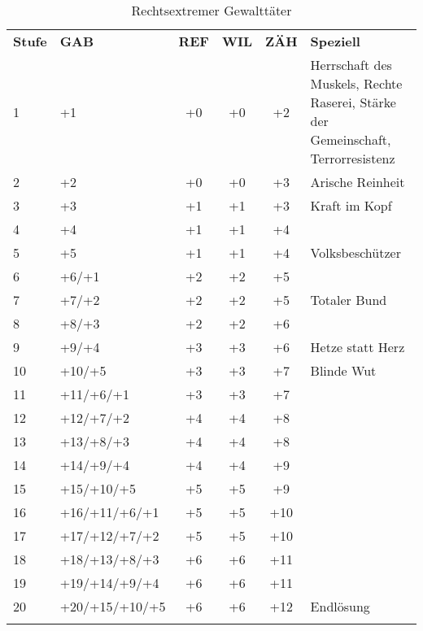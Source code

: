 \documentclass[
	ngerman,
	a4paper,
	11pt,
	twocolumn,
]{scrartcl}
\newlength{\thicktableline}
\newlength{\thintableline}
\newlength{\aboveline}
\newlength{\belowline}
\begin{document}
\begin{table*}[htbp]
	\centering
	\caption{Rechtsextremer Gewalttäter}
	\footnotesize
	\begin{tabularx}{\textwidth}{llcccX}
		\textbf{Stufe}	&\textbf{GAB}	&\textbf{REF}	&\textbf{WIL}	&\textbf{ZÄH}	&\textbf{Speziell}	\\	\specialrule{\thicktableline}{\aboveline}{\belowline}
		1		&+1				&+0		&+0		&+2		&Herrschaft des Muskels, Rechte Raserei, Stärke der Gemeinschaft, Terrorresistenz	\\	\specialrule{\thintableline}{\aboveline}{\belowline}
		2		&+2				&+0		&+0		&+3		&Arische Reinheit	\\	\specialrule{\thintableline}{\aboveline}{\belowline}
		3		&+3				&+1		&+1		&+3		&Kraft im Kopf	\\	\specialrule{\thintableline}{\aboveline}{\belowline}
		4		&+4				&+1		&+1		&+4		&	\\	\specialrule{\thintableline}{\aboveline}{\belowline}
		5		&+5				&+1		&+1		&+4		&Volksbeschützer	\\	\specialrule{\thintableline}{\aboveline}{\belowline}
		6		&+6/+1			&+2		&+2		&+5		&	\\	\specialrule{\thintableline}{\aboveline}{\belowline}
		7		&+7/+2			&+2		&+2		&+5		&Totaler Bund	\\	\specialrule{\thintableline}{\aboveline}{\belowline}
		8		&+8/+3			&+2		&+2		&+6		&	\\	\specialrule{\thintableline}{\aboveline}{\belowline}
		9		&+9/+4			&+3		&+3		&+6		&Hetze statt Herz	\\	\specialrule{\thintableline}{\aboveline}{\belowline}
		10		&+10/+5			&+3		&+3		&+7		&Blinde Wut	\\	\specialrule{\thintableline}{\aboveline}{\belowline}
		11		&+11/+6/+1		&+3		&+3		&+7		&	\\	\specialrule{\thintableline}{\aboveline}{\belowline}
		12		&+12/+7/+2		&+4		&+4		&+8		&	\\	\specialrule{\thintableline}{\aboveline}{\belowline}
		13		&+13/+8/+3		&+4		&+4		&+8		&	\\	\specialrule{\thintableline}{\aboveline}{\belowline}
		14		&+14/+9/+4		&+4		&+4		&+9		&	\\	\specialrule{\thintableline}{\aboveline}{\belowline}
		15		&+15/+10/+5		&+5		&+5		&+9		&	\\	\specialrule{\thintableline}{\aboveline}{\belowline}
		16		&+16/+11/+6/+1	&+5		&+5		&+10	&	\\	\specialrule{\thintableline}{\aboveline}{\belowline}
		17		&+17/+12/+7/+2	&+5		&+5		&+10	&	\\	\specialrule{\thintableline}{\aboveline}{\belowline}
		18		&+18/+13/+8/+3	&+6		&+6		&+11	&	\\	\specialrule{\thintableline}{\aboveline}{\belowline}
		19		&+19/+14/+9/+4	&+6		&+6		&+11	&	\\	\specialrule{\thintableline}{\aboveline}{\belowline}
		20		&+20/+15/+10/+5	&+6		&+6		&+12	&Endlösung	\\	\specialrule{\thicktableline}{\aboveline}{\belowline}
	\end{tabularx}
\end{table*}
\end{document}
